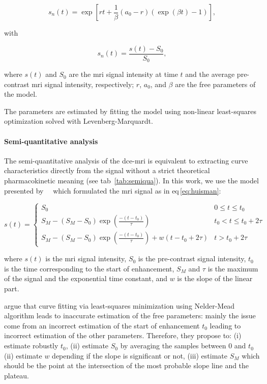 \begin{equation}
  s_n(t) = \exp\left[rt + \frac{1}{\beta} \left( a_0 - r \right) \left( \exp(\beta t) - 1 \right) \right],
  \label{eq:pun2}
\end{equation}

\noindent with

\begin{equation}
  s_n(t) = \frac{s(t) - S_0}{S_0},
  \label{eq:enh}
\end{equation}

\noindent where $s(t)$ and $S_0$ are the \ac{mri} signal intensity at time $t$ and the average pre-contrast \ac{mri} signal intensity, respectively; $r$, $a_0$, and $\beta$ are the free parameters of the model.

The parameters are estimated by fitting the model using non-linear least-squares optimization solved with Levenberg-Marquardt.

\paragraph{Semi-quantitative analysis}\label{par:chp5:DCE-norm:semi}

The semi-quantitative analysis of the \ac{dce}-\ac{mri} is equivalent to extracting curve characteristics directly from the signal without a strict theoretical pharmacokinetic meaning (see \acs{tab}~\ref{tab:semiqua}).
In this work, we use the model presented by~\citeauthor{huisman2001accurate}~\cite{huisman2001accurate} which formulated the \ac{mri} signal as in \acs{eq}\,\eqref{eq:huisman}:

\begin{equation}
  s(t) = \begin{cases}
    S_0 & 0 \leq t \leq t_0 \\
    S_M - (S_M - S_0) \exp\left( \frac{-(t - t_0)}{\tau} \right) & t_0 < t \leq t_0 + 2 \tau \\
    S_M - (S_M - S_0) \exp\left( \frac{-(t - t_0)}{\tau} \right) + w(t - t_0 + 2 \tau) & t > t_0 + 2 \tau
  \end{cases}
  \label{eq:huisman}
\end{equation}

\noindent where $s(t)$ is the \ac{mri} signal intensity, $S_0$ is the pre-contrast signal intensity, $t_0$ is the time corresponding to the start of enhancement, $S_M$ and $\tau$ is the maximum of the signal and the exponential time constant, and $w$ is the slope of the linear part.

\citeauthor{huisman2001accurate} argue that curve fitting via least-squares minimization using Nelder-Mead algorithm leads to inaccurate estimation of the free parameters: mainly the issue come from an incorrect estimation of the start of enhancement $t_0$ leading to incorrect estimation of the other parameters.
Therefore, they propose to:
(i) estimate robustly $t_0$,
(ii) estimate $S_0$ by averaging the samples between $0$ and $t_0$
(ii) estimate $w$ depending if the slope is significant or not,
(iii) estimate $S_M$ which should be the point at the intersection of the most probable slope line and the plateau.

